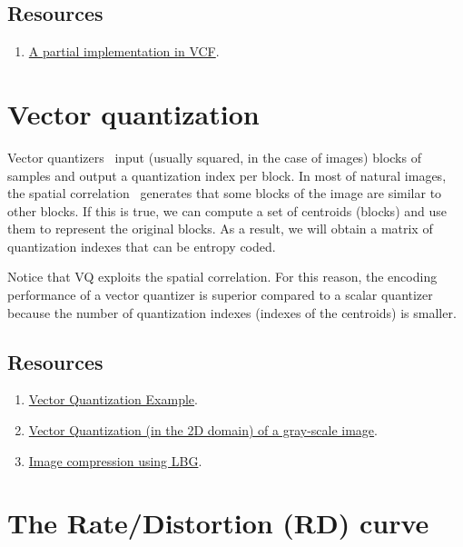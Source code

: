 \subsection*{Resources}

\begin{enumerate}
\item
  \href{https://github.com/Sistemas-Multimedia/VCF/blob/main/src/LloydMax.py}{A
    partial implementation in VCF}.
\end{enumerate}

\section{Vector quantization}

Vector quantizers~\cite{vruiz__vector_quantization} input (usually
squared, in the case of images) blocks of samples and output a
quantization index per block. In most of natural images, the spatial
correlation~\cite{vruiz__visual_redundancy} generates that some blocks
of the image are similar to other blocks. If this is true, we can
compute a set of centroids (blocks) and use them to represent the
original blocks. As a result, we will obtain a matrix of quantization
indexes that can be entropy coded.

Notice that VQ exploits the spatial correlation. For this reason, the
encoding performance of a vector quantizer is superior compared to a
scalar quantizer because the number of quantization indexes (indexes
of the centroids) is smaller.

\subsection*{Resources}

\begin{enumerate}
\item \href{https://scikit-learn.org/stable/auto_examples/cluster/plot_face_compress.html#sphx-glr-auto-examples-cluster-plot-face-compress-py}{Vector Quantization Example}.
\item
  \href{https://github.com/Sistemas-Multimedia/Sistemas-Multimedia.github.io/blob/master/contents/gray_VQ/gray_VQ.ipynb}{Vector
    Quantization (in the 2D domain) of a gray-scale image}.
\item \href{https://github.com/vicente-gonzalez-ruiz/image_vector_quantization_LBG}{Image compression using LBG}.
\end{enumerate}

\section{The Rate/Distortion (RD) curve}

